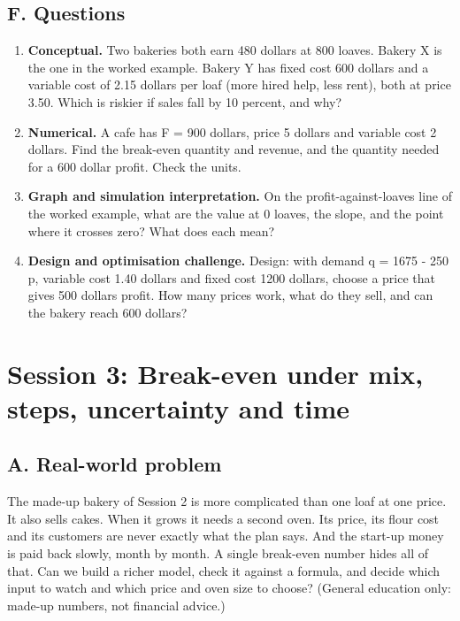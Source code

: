 \documentclass[11pt,a4paper]{article}
\begin{document}
\subsection*{F. Questions}
\begin{enumerate}[nosep]
\item \textbf{Conceptual.} Two bakeries both earn 480 dollars at 800 loaves. Bakery X is the one in the worked example. Bakery Y has fixed cost 600 dollars and a variable cost of 2.15 dollars per loaf (more hired help, less rent), both at price 3.50. Which is riskier if sales fall by 10 percent, and why?
\item \textbf{Numerical.} A cafe has F = 900 dollars, price 5 dollars and variable cost 2 dollars. Find the break-even quantity and revenue, and the quantity needed for a 600 dollar profit. Check the units.
\item \textbf{Graph and simulation interpretation.} On the profit-against-loaves line of the worked example, what are the value at 0 loaves, the slope, and the point where it crosses zero? What does each mean?
\item \textbf{Design and optimisation challenge.} Design: with demand q = 1675 - 250 p, variable cost 1.40 dollars and fixed cost 1200 dollars, choose a price that gives 500 dollars profit. How many prices work, what do they sell, and can the bakery reach 600 dollars?
\end{enumerate}

\section{Session 3: Break-even under mix, steps, uncertainty and time}

\subsection*{A. Real-world problem}
The made-up bakery of Session 2 is more complicated than one loaf at one price. It also sells cakes. When it grows it needs a second oven. Its price, its flour cost and its customers are never exactly what the plan says. And the start-up money is paid back slowly, month by month. A single break-even number hides all of that. Can we build a richer model, check it against a formula, and decide which input to watch and which price and oven size to choose? (General education only: made-up numbers, not financial advice.)
\end{document}
